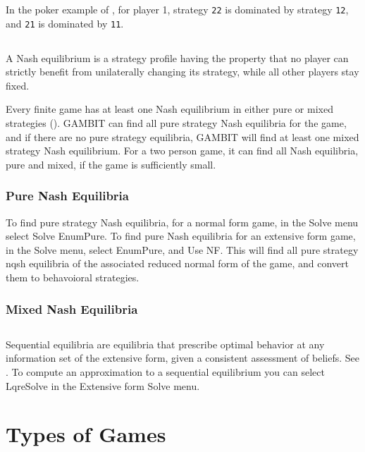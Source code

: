 In the poker example of , 
for player 1, strategy \verb+22+ is dominated by strategy \verb+12+, 
and \verb+21+ is dominated by \verb+11+.  

\subsection{}\label{nashsec}
A Nash equilibrium is a strategy profile having the property that no player
 can strictly benefit from unilaterally changing its strategy, while all 
other players stay fixed.  

Every finite game has at least one Nash equilibrium in either pure or 
mixed strategies (\cite{Nash:1950}).  GAMBIT can find all pure strategy 
Nash equilibria for the game, and if there are no pure strategy equilibria, 
GAMBIT will find at least one mixed strategy Nash equilibrium.  For a two 
person game, it can find all Nash equilibria, pure and mixed, if the game 
is sufficiently small.  

\subsubsection{Pure Nash Equilibria}\label{purenashsec}
To find pure strategy Nash equilibria, for a normal form game, in the Solve 
menu select Solve EnumPure.  To find pure Nash equilibria for an extensive
 form game,  in the Solve menu, select EnumPure, and Use NF.  This will find 
all pure strategy nqsh equilibria of the associated reduced normal form of 
the game, and convert them to behavoioral strategies.  

\subsubsection{Mixed Nash Equilibria}\label{mixednashsec}

\subsection{}\label{seqnashsec}
Sequential equilibria are equilibria that prescribe optimal behavior at any 
information set of the extensive form, given a consistent assessment of 
beliefs.  See \cite{KrepsWilson:1982}.  To compute an approximation to a
 sequential equilibrium you can select LqreSolve in the Extensive form Solve
 menu. 

\section{Types of Games}
